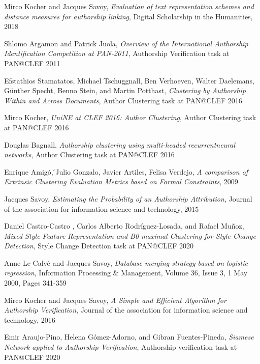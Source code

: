 \begin{thebibliography}{9}


Mirco Kocher and Jacques Savoy,
\textit{Evaluation of text representation schemes and distance measures for authorship linking},
Digital Scholarship in the Humanities, 2018

Shlomo Argamon and Patrick Juola,
\textit{Overview of the International Authorship Identification Competition at PAN-2011},
Authorship Verification task at PAN@CLEF 2011

Efstathios Stamatatos, Michael Tschuggnall, Ben Verhoeven, Walter Daelemans, Günther Specht, Benno Stein, and Martin Potthast,
\textit{Clustering by Authorship Within and Across Documents},
Author Clustering task at PAN@CLEF 2016

Mirco Kocher,
\textit{UniNE at CLEF 2016: Author Clustering},
Author Clustering task at PAN@CLEF 2016

Douglas Bagnall,
\textit{Authorship clustering using multi-headed recurrentneural networks},
Author Clustering task at PAN@CLEF 2016


Enrique Amigó, ́Julio Gonzalo, Javier Artiles, Felisa Verdejo,
\textit{A comparison of Extrinsic Clustering Evaluation Metrics based on Formal Constraints},
2009

Jacques Savoy,
\textit{Estimating the Probability of an Authorship Attribution},
Journal of the association for information science and technology, 2015

Daniel Castro-Castro , Carlos Alberto Rodríguez-Losada, and Rafael Muñoz,
\textit{Mixed Style Feature Representation and B0-maximal Clustering for Style Change Detection},
Style Change Detection task at PAN@CLEF 2020

Anne Le Calvé and Jacques Savoy,
\textit{Database merging strategy based on logistic regression},
Information Processing \& Management, Volume 36, Issue 3, 1 May 2000, Pages 341-359

Mirco Kocher and Jacques Savoy,
\textit{A Simple and Efficient Algorithm for Authorship Verification},
Journal of the association for information science and technology, 2016

Emir Araujo-Pino, Helena Gómez-Adorno, and Gibran Fuentes-Pineda,
\textit{Siamese Network applied to Authorship Verification},
Authorship verification task at PAN@CLEF 2020


\end{thebibliography}
